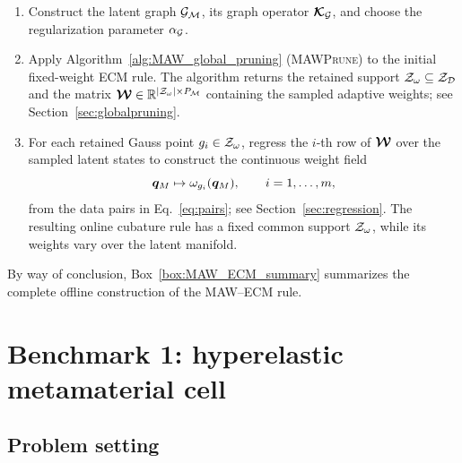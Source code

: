 \documentclass[preprint,10pt]{elsarticle}  %
\newcommand{\PROMPT}[1]{ }
\begin{document}
\begin{BOX}
\begin{enumerate}
\item Construct the latent graph \(\mathcal{G}_{\mathcal{M}}\), its graph operator
\(\boldsymbol{\mathcal{K}}_{\mathcal{G}}\), and choose the regularization parameter \(\alpha_{\mathcal{G}}\).

 \item Apply Algorithm~\ref{alg:MAW_global_pruning}
(\textsc{MAWPrune}) to the initial fixed-weight ECM rule. The algorithm
returns the retained support
\(\mathcal{Z}_{\omega}\subseteq\mathcal{Z}_{\mathcal{D}}\) and the matrix
\(\boldsymbol{\mathcal{W}}\in\mathbb{R}^{|\mathcal{Z}_{\omega}|\times P_{\mathcal{M}}}\) containing the sampled
adaptive weights; see Section~\ref{sec:globalpruning}.

\item For each retained Gauss point \(g_i\in\mathcal{Z}_{\omega}\), regress the
\(i\)-th row of \(\boldsymbol{\mathcal{W}}\) over the sampled latent states to construct
the continuous weight field
\[
\bm{q}_M\mapsto\omega_{g_i}(\bm{q}_M),
\qquad i=1,\ldots,m,
\]
from the data pairs in Eq.~\eqref{eq:pairs}; see
Section~\ref{sec:regression}. The resulting online cubature rule has a
fixed common support \(\mathcal{Z}_{\omega}\), while its weights vary over the
latent manifold.

\end{enumerate}

\end{BOX}



By way of conclusion, Box~\ref{box:MAW_ECM_summary}
summarizes the complete offline construction of the MAW--ECM rule.




\section{Benchmark 1: hyperelastic metamaterial cell}
\label{sec:metamaterial}




\subsection{Problem setting}
 \label{sec:meta_problem_setting}
\end{document}
